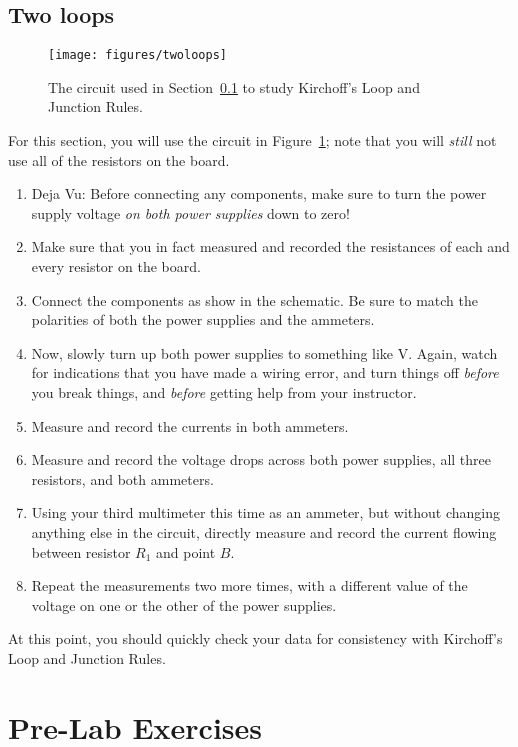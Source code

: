 \documentclass[12pt]{article}
\begin{document}
\subsection{Two loops}
\label{sec:twoloops}

\begin{figure}
  \centering
  \texttt{[image: figures/twoloops]}
  \caption{The circuit used in Section~\ref{sec:twoloops} to study
    Kirchoff's Loop and Junction Rules.} 
  \label{fig:twoloops}
\end{figure}

For this section, you will use the circuit in
Figure~\ref{fig:twoloops}; note that you will \textit{still} not use
all of the resistors on the board.
\begin{enumerate}
\item Deja Vu: Before connecting any components, make sure to turn the
  power supply voltage \textit{on both power supplies} down to zero!
\item Make sure that you in fact measured and recorded the resistances
  of each and every resistor on the board.
\item Connect the components as show in the schematic.  Be sure to
  match the polarities of both the power supplies and the ammeters.
\item Now, slowly turn up both power supplies to something like
  \unit[15]{V}.  Again, watch for indications that you have made a
  wiring error, and turn things off \textit{before} you break things,
  and \textit{before} getting help from your instructor.
\item Measure and record the currents in both ammeters.
\item Measure and record the voltage drops across both power supplies,
  all three resistors, and both ammeters.
\item Using your third multimeter this time as an ammeter, but without
  changing anything else in the circuit, directly measure and record
  the current flowing between resistor $R_1$ and point $B$.
\item Repeat the measurements two more times, with a different value
  of the voltage on one or the other of the power supplies.
\end{enumerate}
At this point, you should quickly check your data for consistency with
Kirchoff's Loop and Junction Rules.

\newpage
\section*{Pre-Lab Exercises}
\end{document}
